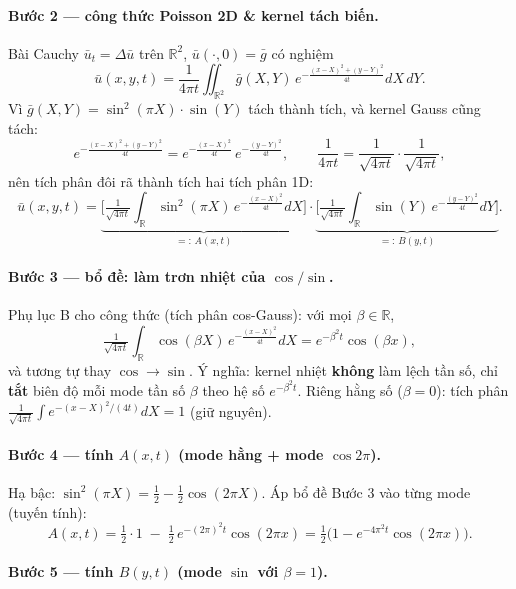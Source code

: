 \paragraph{Bước 2 --- công thức Poisson 2D \& kernel tách biến.}\leavevmode

Bài Cauchy $\bar u_t=\Delta\bar u$ trên $\mathbb R^2$, $\bar u(\cdot,0)=\bar g$ có nghiệm
\[
  \bar u(x,y,t)=\frac{1}{4\pi t}\!\iint_{\mathbb R^2}\bar g(X,Y)\,e^{-\frac{(x-X)^2+(y-Y)^2}{4t}}dX\,dY.
\]
Vì $\bar g(X,Y)=\sin^2(\pi X)\cdot\sin(Y)$ tách thành tích, và kernel Gauss cũng tách:
\[
  e^{-\frac{(x-X)^2+(y-Y)^2}{4t}}=e^{-\frac{(x-X)^2}{4t}}\,e^{-\frac{(y-Y)^2}{4t}},\qquad
  \frac{1}{4\pi t}=\frac{1}{\sqrt{4\pi t}}\cdot\frac{1}{\sqrt{4\pi t}},
\]
nên tích phân đôi rã thành tích hai tích phân 1D:
\[
  \bar u(x,y,t)=\underbrace{\Big[\tfrac{1}{\sqrt{4\pi t}}\!\int_{\mathbb R}\!\sin^2(\pi X)\,e^{-\frac{(x-X)^2}{4t}}dX\Big]}_{=:\,A(x,t)}
  \cdot\underbrace{\Big[\tfrac{1}{\sqrt{4\pi t}}\!\int_{\mathbb R}\!\sin(Y)\,e^{-\frac{(y-Y)^2}{4t}}dY\Big]}_{=:\,B(y,t)}.
\]

\paragraph{Bước 3 --- bổ đề: làm trơn nhiệt của $\cos/\sin$.}\leavevmode

Phụ lục B cho công thức (tích phân cos-Gauss): với mọi $\beta\in\mathbb R$,
\[
  \tfrac{1}{\sqrt{4\pi t}}\!\int_{\mathbb R}\!\cos(\beta X)\,e^{-\frac{(x-X)^2}{4t}}dX=e^{-\beta^2 t}\cos(\beta x),
\]
và tương tự thay $\cos\to\sin$. Ý nghĩa: kernel nhiệt \textbf{không} làm lệch tần số, chỉ \textbf{tắt} biên độ mỗi mode tần số $\beta$ theo hệ số $e^{-\beta^2 t}$. Riêng hằng số ($\beta=0$): tích phân $\tfrac{1}{\sqrt{4\pi t}}\!\int e^{-(x-X)^2/(4t)}dX=1$ (giữ nguyên).

\paragraph{Bước 4 --- tính $A(x,t)$ (mode hằng + mode $\cos2\pi$).}\leavevmode

Hạ bậc: $\sin^2(\pi X)=\tfrac12-\tfrac12\cos(2\pi X)$. Áp bổ đề Bước 3 vào từng mode (tuyến tính):
\[
  A(x,t)=\tfrac12\cdot 1\;-\;\tfrac12\,e^{-(2\pi)^2 t}\cos(2\pi x)
  =\tfrac12\Big(1-e^{-4\pi^2 t}\cos(2\pi x)\Big).
\]

\paragraph{Bước 5 --- tính $B(y,t)$ (mode $\sin$ với $\beta=1$).}\leavevmode

